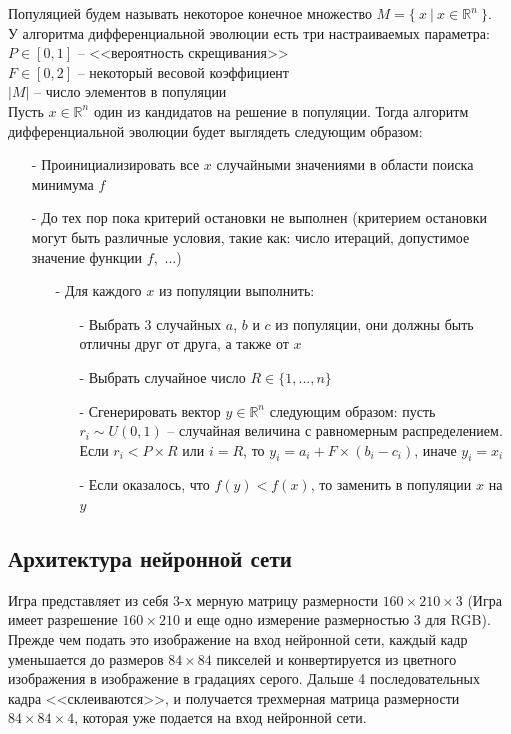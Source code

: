 \documentclass[12pt]{article}
\begin{document}
        Популяцией будем называть некоторое конечное множество $M=\{~x~|~x \in \mathbb{R}^n~\}$. \\

        У алгоритма дифференциальной эволюции есть три настраиваемых параметра: \\ 
        $P \in [0, 1]$ -- <<вероятность скрещивания>> \\
        $F \in [0, 2]$ -- некоторый весовой коэффициент \\
        $|M|$ -- число элементов в популяции \\

        Пусть $x \in \mathbb{R}^n$ один из кандидатов на решение в популяции. Тогда алгоритм дифференциальной эволюции будет выглядеть следующим образом:

        \begin{itemize}
            \item[-] Проинициализировать все $x$ случайными значениями в области поиска минимума $f$
            \item[-] До тех пор пока критерий остановки не выполнен (критерием остановки могут быть различные условия, такие как: число итераций, допустимое значение функции $f$,~...)
            \begin{itemize}
                \item[-] Для каждого $x$ из популяции выполнить:
                \begin{itemize}
                    \item[-] Выбрать 3 случайных $a$, $b$ и $c$ из популяции, они должны быть отличны друг от друга, а также от $x$
                    \item[-] Выбрать случайное число $R \in \{1, ..., n\}$
                    \item[-] Сгенерировать вектор $y \in \mathbb{R}^n$ следующим образом: пусть $r_i \sim U(0, 1)$ -- случайная величина с равномерным распределением. Если $r_i < P \times R$ или $i = R$, то $y_i = a_i + F \times (b_i - c_i)$, иначе $y_i = x_i$
                    \item[-] Если оказалось, что $f(y) < f(x)$, то заменить в популяции $x$ на $y$
                \end{itemize}
            \end{itemize}
        \end{itemize}

        \subsection{Архитектура нейронной сети}
            Игра представляет из себя $3$-х мерную матрицу размерности $160 \times 210 \times 3$ (Игра имеет разрешение $160 \times 210$ и еще одно измерение размерностью $3$ для RGB). Прежде чем подать это изображение на вход нейронной сети, каждый кадр уменьшается до размеров $84 \times 84$ пикселей и конвертируется из цветного изображения в изображение в градациях серого. Дальше 4 последовательных кадра <<склеиваются>>, и получается трехмерная матрица размерности $84 \times 84 \times 4$, которая уже подается на вход нейронной сети. \\
\end{document}
